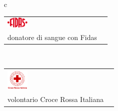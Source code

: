 

\begin{longtable}{c}
	\begin{tabular}{l r}
		\includegraphics[width=40px, keepaspectratio,valign=m]{fidas} & \makecell{\emph{dal 2019}\\donatore di sangue con Fidas}
	\end{tabular}\\[0.4cm]
	\begin{tabular}{l r}
		\includegraphics[height=40px, keepaspectratio,valign=m]{cri} & \makecell{\emph{dal 2020}\\volontario Croce Rossa Italiana}
	\end{tabular}
\end{longtable}